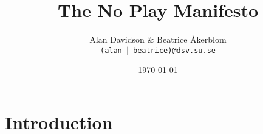 \documentclass[a4paper,10pt]{article}
\title{The No Play Manifesto}
\author{Alan Davidson \& Beatrice Åkerblom\\ 
  \texttt{(alan $|$ beatrice)@dsv.su.se}}
\date{\today}
\begin{document}
\maketitle
\tableofcontents

\section{Introduction}
\end{document}

